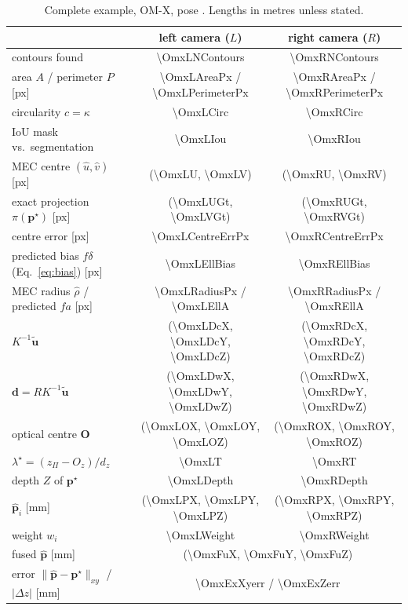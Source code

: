 \documentclass[11pt,a4paper]{article}
\theoremstyle{definition}
\theoremstyle{remark}
\newcommand{\vect}[1]{\bm{#1}}
\newcommand{\code}[1]{\texttt{\detokenize{#1}}}
\begin{document}
\begin{table}[ht]
\centering
\small
\caption{Complete example, OM-X, pose \code{pick_default}. Lengths in metres
unless stated.}
\label{tab:example}
\begin{tabular}{@{}lcc@{}}
\toprule
& left camera ($L$) & right camera ($R$)\\
\midrule
contours found & \num{\OmxLNContours} & \num{\OmxRNContours}\\
area $A$ / perimeter $P$ [px] & \num{\OmxLAreaPx} / \num{\OmxLPerimeterPx} & \num{\OmxRAreaPx} / \num{\OmxRPerimeterPx}\\
circularity $c=\kappa$ & \num{\OmxLCirc} & \num{\OmxRCirc}\\
IoU mask vs.\ segmentation & \num{\OmxLIou} & \num{\OmxRIou}\\
MEC centre $(\hat u,\hat v)$ [px] & (\num{\OmxLU}, \num{\OmxLV}) & (\num{\OmxRU}, \num{\OmxRV})\\
exact projection $\pi(\vect p^\star)$ [px] & (\num{\OmxLUGt}, \num{\OmxLVGt}) & (\num{\OmxRUGt}, \num{\OmxRVGt})\\
centre error [px] & \num{\OmxLCentreErrPx} & \num{\OmxRCentreErrPx}\\
predicted bias $f\delta$ (Eq.~\ref{eq:bias}) [px] & \num{\OmxLEllBias} & \num{\OmxREllBias}\\
MEC radius $\hat\rho$ / predicted $fa$ [px] & \num{\OmxLRadiusPx} / \num{\OmxLEllA} & \num{\OmxRRadiusPx} / \num{\OmxREllA}\\
\midrule
$K^{-1}\tilde{\vect u}$ & (\num{\OmxLDcX}, \num{\OmxLDcY}, \num{\OmxLDcZ}) & (\num{\OmxRDcX}, \num{\OmxRDcY}, \num{\OmxRDcZ})\\
$\vect d=RK^{-1}\tilde{\vect u}$ & (\num{\OmxLDwX}, \num{\OmxLDwY}, \num{\OmxLDwZ}) & (\num{\OmxRDwX}, \num{\OmxRDwY}, \num{\OmxRDwZ})\\
optical centre $\vect O$ & (\num{\OmxLOX}, \num{\OmxLOY}, \num{\OmxLOZ}) & (\num{\OmxROX}, \num{\OmxROY}, \num{\OmxROZ})\\
$\lambda^\star=(z_\Pi-O_z)/d_z$ & \num{\OmxLT} & \num{\OmxRT}\\
depth $Z$ of $\vect p^\star$ & \num{\OmxLDepth} & \num{\OmxRDepth}\\
$\hat{\vect p}_i$ [mm] & (\num{\OmxLPX}, \num{\OmxLPY}, \num{\OmxLPZ}) & (\num{\OmxRPX}, \num{\OmxRPY}, \num{\OmxRPZ})\\
weight $w_i$ & \num{\OmxLWeight} & \num{\OmxRWeight}\\
\midrule
fused $\hat{\vect p}$ [mm] & \multicolumn{2}{c}{(\num{\OmxFuX}, \num{\OmxFuY}, \num{\OmxFuZ})}\\
error $\|\hat{\vect p}-\vect p^\star\|_{xy}$ / $|\Delta z|$ [mm] & \multicolumn{2}{c}{\num{\OmxExXyerr} / \num{\OmxExZerr}}\\
\bottomrule
\end{tabular}
\end{table}
\end{document}
